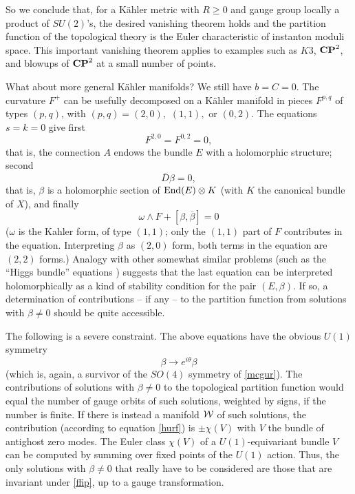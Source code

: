 \documentclass[12pt]{article}
\numberwithin{equation}{section}
\def\bar{\overline}
\begin{document}
So we conclude that, for a K\"ahler metric with $R\geq 0$ and
gauge group locally a product of $SU(2)$'s, the desired vanishing theorem
holds and the partition function of the topological theory is the
Euler characteristic of instanton moduli space.
This important vanishing theorem applies to examples such as $K3$,
${\bf CP}^2$, and blowups of ${\bf CP}^2$ at a small number of points.

\bigskip
{}

What about more general K\"ahler manifolds?  We still have $b=C=0$.
The curvature $F^+$ can be usefully decomposed on a K\"ahler manifold
in pieces $F^{p,q}$ of types $(p,q)$, with $(p,q)=(2,0),\,\,(1,1),$ or $(0,2)$.
The equations $s=k=0$ give first
\begin{equation}
  \label{firste}
  F^{2,0}=F^{0,2}=0,
\end{equation}
that is, the connection $A$ endows the bundle $E$ with a holomorphic
structure; second
\begin{equation}
  \label{seconde}
  \bar D\beta=0,
\end{equation}
that is, $\beta$ is a holomorphic section of ${\rm End}(E)\otimes K$
(with $K$ the canonical bundle of $X$),
and finally
\begin{equation}
  \label{thirde}
  \omega\wedge F+\left[\beta,\bar\beta\right]=0
\end{equation}
($\omega$ is the Kahler form, of type $(1,1)$; only the $(1,1)$ part of
  $F$ contributes in the equation.  Interpreting $\beta$ as $ (2,0)$ form,
both terms in the equation are $(2,2)$ forms.)
Analogy with other somewhat similar problems (such as the ``Higgs bundle''
equations \cite{hitchin})
suggests that the last
equation can be interpreted holomorphically
as a kind of stability condition for the pair $(E,\beta)$.
If so, a determination of contributions -- if any -- to the partition
function from solutions with $\beta\not= 0$ should be quite accessible.

The following is a severe constraint.
The above equations have the obvious $U(1)$ symmetry
\begin{equation}
  \label{ffip}
  \beta\to e^{i\theta}\beta
\end{equation}
(which is, again, a survivor of the $SO(4)$ symmetry of \eqref{mcgur}).
The contributions of solutions with $\beta\not= 0$ to the topological partition
function would equal the number of gauge orbits of
such solutions, weighted by signs,
if the number is finite.  If there is instead a manifold ${\cal W}$
of such solutions, the contribution (according to equation \eqref{hurf})
is $\pm \chi(V)$ with $V$ the bundle of antighost zero modes.
The Euler class $\chi(V)$ of a $U(1)$-equivariant bundle $V$ can be computed
by summing over fixed points of the $U(1)$ action.
Thus, the only solutions with $\beta\not= 0$ that really have to be
considered are those that are invariant under \eqref{ffip}, up to a gauge
transformation.
\end{document}
